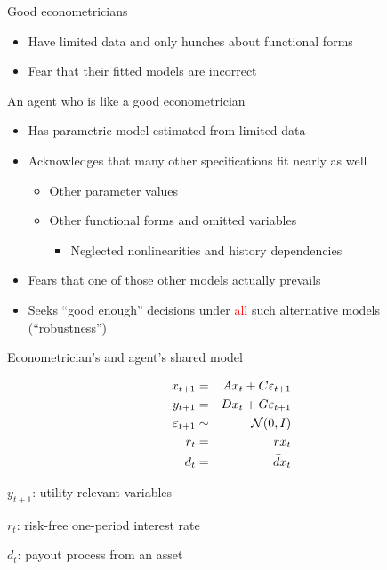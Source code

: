 \documentclass{beamer}
\theoremstyle{Definition}
\begin{document}
\begin{frame}{Good econometricians}

\begin{itemize}
\item Have  limited data and  only  hunches about functional forms
\item Fear that their fitted   models are incorrect
\end{itemize}

\end{frame}

\begin{frame}{An agent who is  like a good econometrician}
\begin{itemize}
\item Has parametric model estimated from limited  data
\item Acknowledges that many other  specifications fit  nearly as well
\begin{itemize}
\item Other parameter values
 \item Other functional forms and omitted variables
 \begin{itemize}
  \item Neglected nonlinearities and  history dependencies
  \end{itemize}
\end{itemize}
\item Fears that one of those other models actually prevails
\item Seeks ``good enough'' decisions under \textcolor{red}{all} such alternative models (``robustness'')
\end{itemize}
\end{frame}



\begin{frame}{Econometrician's and agent's shared model}


\begin{eqnarray*}
x_{t+1} & = & A x_t + C \varepsilon_{t+1} \cr
y_{t+1} & = & D x_t + G \varepsilon_{t+1} \cr
\varepsilon_{t+1} & \sim &{\mathcal N}(0,I) \cr
r_t & = & \bar r x_t \cr
d_t & = & \bar d x_t
\end{eqnarray*}

$y_{t+1}$: utility-relevant variables

$r_t$: risk-free one-period interest rate

$d_t$: payout process from an asset

\end{frame}
\end{document}
